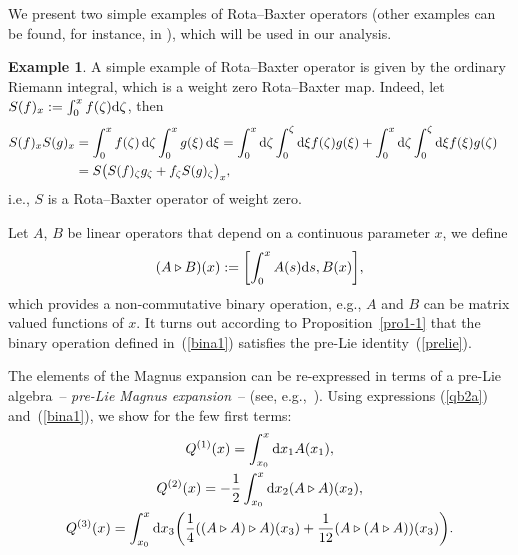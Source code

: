 \documentclass[10pt,a4paper]{amsart}
\numberwithin{equation}{section}
\theoremstyle{definition}
\newtheorem{exam}[thm]{Example}
\def\mathcal#1{#1}%
\begin{document}
We present two simple examples of Rota--Baxter operators
(other examples can be found, for instance, in
\cite{EbraMan, new3, new4}), which will be
used in our analysis.
\begin{exam} \label{ex0}
A simple example of Rota--Baxter operator is given by the ordinary Riemann integral, which is a weight
zero Rota--Baxter map. Indeed, let
$S(f)_x := \int_{0}^x f(\zeta) {\rm d}\zeta$, then
\begin{align*}
S(f)_x S(g)_x &= \int_{0}^x f(\zeta) \,{\rm d}\zeta \int_0^x g(\xi) \,{\rm d}\xi
= \int _0^x {\rm d}\zeta \int_0^{\zeta} {\rm d}\xi f(\zeta) g(\xi) + \int _0^x {\rm d}\zeta \int_0^{\zeta}{\rm d}\xi f(\xi) g(\zeta) \cr
&= S\bigl(S(f)_{\zeta}g_{\zeta} + f_{\zeta} S(g)_{\zeta} \bigr)_x,
\end{align*}
i.e., $S$ is a Rota--Baxter operator of weight zero.

Let $A$, $B$ be linear operators that depend on a continuous parameter $x$, we define
\begin{equation}
(A \triangleright B)(x) : = \biggl[ \int_0^x A(s) {\rm d}s, B(x) \biggr], \label{bina1}
\end{equation}
which provides a non-commutative binary operation, e.g., $A$ and $B$
can be matrix valued functions of $x$.
It turns out according to Proposition~\ref{pro1-1} that the binary operation
defined in~(\ref{bina1}) satisfies the pre-Lie identity~(\ref{prelie}).

The elements of the Magnus expansion can be re-expressed in terms of a pre-Lie algebra~-- {\it pre-Lie Magnus expansion}~-- (see, e.g.,~\cite{Fer, EbraMan, new3,new4}).
Using expressions
(\ref{qb2a}) and~(\ref{bina1}), we show for the few first terms:
\begin{gather}
{\mathcal Q}^{(1)}(x) = \int_{x_0}^x {\rm d}x_1 A(x_1), \cr
{\mathcal Q}^{(2)}(x) = - \frac{1}{2} \int_{x_0}^x {\rm d}x_2 (A\triangleright A )(x_2),\cr
 {\mathcal Q}^{(3)}(x) = \int_{x_0}^x{\rm d}x_3 \biggl(\frac{1}{4}((A \triangleright A )
\triangleright A)(x_3) + \frac{1}{12} (A \triangleright (A \triangleright A))
(x_3) \biggr). \label{qb2b}
\end{gather}
\end{exam}
\end{document}
